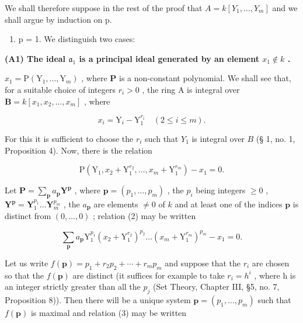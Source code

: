 We shall therefore suppose in the rest of the proof that \(A = k[Y_{1}, \ldots, Y_{m}]\) and we shall argue by induction on p.

\begin{enumerate}
\def\labelenumi{(\Alph{enumi})}
\tightlist
\item
  p = 1. We distinguish two cases:
\end{enumerate}

\textbf{(A1) The ideal \(\mathfrak{a}_1\) is a principal ideal generated by an element \(x_1 \notin k\) .}\par

\(x_{1} = \mathrm{P}(\mathrm{Y}_{1},\ldots ,\mathrm{Y}_{m})\) , where \(\mathbf{P}\) is a non-constant polynomial. We shall see that, for a suitable choice of integers \(r_i > 0\) , the ring A is integral over \(\mathbf{B} = k[x_1,x_2,\dots ,x_m]\) , where

\[
x _ {i} = \mathrm{Y} _ {i} - \mathrm{Y} _ {1} ^ {r _ {i}} \quad (2 \leqslant i \leqslant m).\tag{1}
\]

For this it is sufficient to choose the \(r_i\) such that \(Y_1\) is integral over \(B\) (§ 1, no. 1, Proposition 4). Now, there is the relation

\[
\mathrm{P} \left(\mathrm{Y} _ {1}, x _ {2} + \mathrm{Y} _ {1} ^ {r _ {2}}, \dots , x _ {m} + \mathrm{Y} _ {1} ^ {r _ {m}}\right) - x _ {1} = 0.\tag{2}
\]

Let \(\mathbf{P} = \sum_{\mathbf{p}} a_{\mathbf{p}} \mathbf{Y}^{\mathbf{p}}\) , where \(\mathbf{p} = (p_1, \ldots, p_m)\) , the \(p_i\) being integers \(\geqslant 0\) , \(\mathbf{Y}^{\mathbf{p}} = \mathbf{Y}_1^{p_1} \ldots \mathbf{Y}_m^{p_m}\) , the \(a_{\mathbf{p}}\) are elements \(\neq 0\) of \(k\) and at least one of the indices \(\mathbf{p}\) is distinct from \((0, \ldots, 0)\) ; relation (2) may be written

\[
\sum_ {\mathbf {p}} a _ {\mathbf {p}} \mathrm{Y} _ {1} ^ {p _ {1}} (x _ {2} + \mathrm{Y} _ {1} ^ {r _ {2}}) ^ {p _ {2}} \dots (x _ {m} + \mathrm{Y} _ {1} ^ {r _ {m}}) ^ {p _ {m}} - x _ {1} = 0.\tag{3}
\]

Let us write \(f(\mathbf{p}) = p_{1} + r_{2}p_{2} + \cdots + r_{m}p_{m}\) and suppose that the \(r_{i}\) are chosen so that the \(f(\mathbf{p})\) are distinct (it suffices for example to take \(r_{i} = h^{i}\) , where h is an integer strictly greater than all the \(p_{j}\) (Set Theory, Chapter III, §5, no. 7, Proposition 8)). Then there will be a unique system \(\mathbf{p} = (p_{1}, \ldots, p_{m})\) such that \(f(\mathbf{p})\) is maximal and relation (3) may be written

